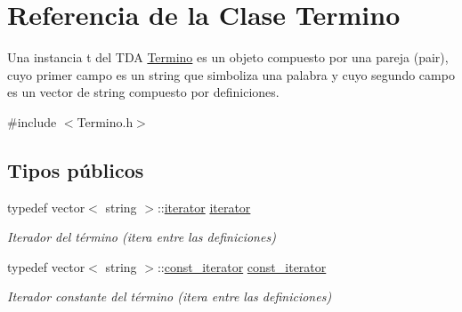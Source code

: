 \hypertarget{classTermino}{}\section{Referencia de la Clase Termino}
\label{classTermino}


Una instancia t del T\+DA \hyperlink{classTermino}{Termino} es un objeto compuesto por una pareja (pair), cuyo primer campo es un string que simboliza una palabra y cuyo segundo campo es un vector de string compuesto por definiciones.  




{\ttfamily \#include $<$Termino.\+h$>$}

\subsection*{Tipos públicos}
\begin{DoxyCompactItemize}
\item 
\mbox{\label{classTermino_a47bf17fd54656f315aa9257b4372e875}} 
typedef vector$<$ string $>$\+::\hyperlink{classTermino_a47bf17fd54656f315aa9257b4372e875}{iterator} \hyperlink{classTermino_a47bf17fd54656f315aa9257b4372e875}{iterator}
\begin{DoxyCompactList}\small\item\em Iterador del término (itera entre las definiciones) \end{DoxyCompactList}\item 
\mbox{\label{classTermino_a0c8a38779eb1a65b8fe9422b430895c9}} 
typedef vector$<$ string $>$\+::\hyperlink{classTermino_a0c8a38779eb1a65b8fe9422b430895c9}{const\+\_\+iterator} \hyperlink{classTermino_a0c8a38779eb1a65b8fe9422b430895c9}{const\+\_\+iterator}
\begin{DoxyCompactList}\small\item\em Iterador constante del término (itera entre las definiciones) \end{DoxyCompactList}\end{DoxyCompactItemize}
